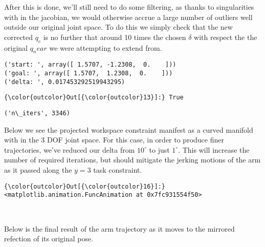 \documentclass{article}
\begin{document}
After this is done, we'll still need to do some filtering, as thanks to
singularities with in the jacobian, we would otherwise accrue a large
number of outliers well outside our original joint space. To do this we
simply check that the new corrected $q_c$ is no further that around 10
times the chosen $\delta$ with respect the the original $q_near$ we were
attempting to extend from.



    \begin{Verbatim}[commandchars=\\\{\}]
('start: ', array([ 1.5707, -1.2308,  0.    ]))
('goal: ', array([ 1.5707,  1.2308,  0.    ]))
('delta: ', 0.017453292519943295)
    \end{Verbatim}

            \begin{Verbatim}[commandchars=\\\{\}]
{\color{outcolor}Out[{\color{outcolor}13}]:} True
\end{Verbatim}
        

    \begin{Verbatim}[commandchars=\\\{\}]
('n\_iters', 3346)
    \end{Verbatim}

    Below we see the projected workspace constraint manifest as a curved
manifold with in the 3 DOF joint space. For this case, in order to
produce finer trajectories, we've reduced our delta from $10^\circ$ to
just $1^\circ$. This will increase the number of required iterations,
but should mitigate the jerking motions of the arm as it passed along
the $y=3$ task constraint.



            \begin{Verbatim}[commandchars=\\\{\}]
{\color{outcolor}Out[{\color{outcolor}16}]:} <matplotlib.animation.FuncAnimation at 0x7fc931554f50>
\end{Verbatim}
        
    \begin{center}
    \end{center}
    { \hspace*{\fill} \\}
    
    Below is the final result of the arm trajectory as it moves to the
mirrored refection of its original pose.
\end{document}
